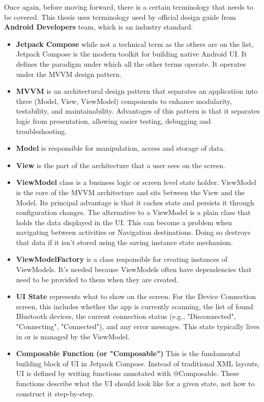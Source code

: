 Once again, before moving forward, there is a certain terminology that needs to be covered. This thesis uses terminology used by official design guide\cite{android_ui_layer} from \textbf{Android Developers} team, which is an industry standard.
\begin{itemize}
	\item \textbf{Jetpack Compose} while not a technical term as the others are on the list, Jetpack Compose is the modern toolkit for building native Android \ac{UI}. It defines the paradigm under which all the other terms operate. It operates under the \ac{MVVM} design pattern.
	\item \textbf{\ac{MVVM}} is an architectural design pattern that separates an application into three (Model, View, ViewModel) components to enhance modularity, testability, and maintainability. Advantages of this pattern is that it separates logic from presentation, allowing easier testing, debugging and troubleshooting\cite{García2023}.
	\item \textbf{Model} is responsible for manipulation, access and storage of data.
	\item \textbf{View} is the part of the architecture that a user sees on the screen. 
	\item \textbf{ViewModel} class is a business logic or screen level state holder. ViewModel is the core of the \ac{MVVM} architecture and sits between the View and the Model. Its principal advantage is that it caches state and persists it through configuration changes. The alternative to a ViewModel is a plain class that holds the data displayed in the \ac{UI}. This can become a problem when navigating between activities or Navigation destinations. Doing so destroys that data if it isn't stored using the saving instance state mechanism. 
	\item \textbf{ViewModelFactory} is a class responsible for creating instances of ViewModels. It's needed because ViewModels often have dependencies that need to be provided to them when they are created.
	\item \textbf{UI State} represents what to show on the screen. For the Device Connection screen, this includes whether the app is currently scanning, the list of found Bluetooth devices, the current connection status (e.g., "Disconnected", "Connecting", "Connected"), and any error messages. This state typically lives in or is managed by the ViewModel.
	\item \textbf{Composable Function (or "Composable")} This is the fundamental building block of \ac{UI} in Jetpack Compose. Instead of traditional XML layouts, \ac{UI} is defined by writing functions annotated with @Composable. These functions describe what the \ac{UI} should look like for a given state, not how to construct it step-by-step.

\end{itemize}
